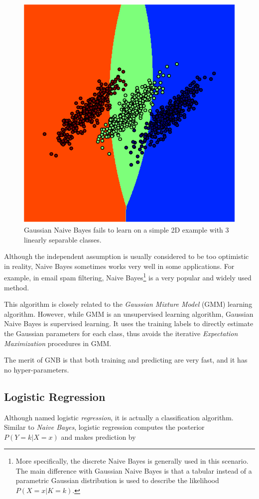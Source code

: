 \begin{figure}
    \centering\includegraphics[width=.5\linewidth]{fig/multiclass/gnb-fail-case}
    \caption{Gaussian Naive Bayes fails to learn on a simple 2D example with 3
    linearly separable classes.}
    \label{fig:mc-gnb-fail}
\end{figure}

Although the independent assumption is usually considered to be too optimistic 
in reality, Naive Bayes sometimes works very well in some applications. For 
example, in email spam filtering, Naive Bayes\footnote{More specifically, the 
    discrete Naive Bayes is generally used in this scenario. The main 
    difference with Gaussian Naive Bayes is that a tabular instead of a 
    parametric Gaussian distribution is used to describe the likelihood 
    $P(X=x|K=k)$.} is a very popular and widely used method.

This algorithm is closely related to the \emph{Gaussian Mixture Model} (GMM) learning
algorithm. However, while GMM is an unsupervised learning algorithm, Gaussian
Naive Bayes is supervised learning. It uses the training labels to directly
estimate the Gaussian parameters for each class, thus avoids the iterative
\emph{Expectation Maximization} procedures in GMM.

The merit of GNB is that both training and predicting are very fast, and it has
no hyper-parameters.

\subsection{Logistic Regression}

Although named logistic \emph{regression}, it is actually a classification
algorithm. Similar to \emph{Naive Bayes}, logistic regression computes the
posterior $P(Y=k|X=x)$ and makes prediction by

